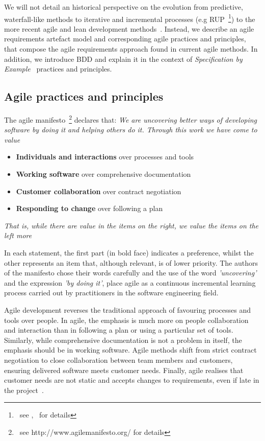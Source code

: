 \documentclass[dissertation,final]{softeng}
\begin{document}
We will not detail an historical perspective on the evolution from predictive, waterfall-like methods to iterative and incremental processes (e.g RUP~\footnote{~see ,~ \citet{Kruchten2003} for details}) to the more recent agile and lean development methods~\citep{Leffingwell2011,Larman2003}. Instead, we describe an agile requirements artefact model and corresponding agile practices and principles, that compose the agile requirements approach found in current agile methods. In addition, we introduce BDD and explain it in the context of \emph{Specification by Example}~\citep{Adzic201106} practices and principles.

\subsection{Agile practices and principles}
The agile manifesto~\footnote{~see http://www.agilemanifesto.org/ for details} declares that: 
\emph{We are uncovering better ways of developing software by doing it and helping others do it. Through this work we have come to value}

\begin{itemize}
\item \textbf{Individuals and interactions} over processes and tools
\item \textbf{Working software} over comprehensive documentation
\item \textbf{Customer collaboration} over contract negotiation
\item \textbf{Responding to change} over following a plan
\end{itemize}
\emph{That is, while there are value in the items on the right, we value the items on the left more}

In each statement, the first part (in bold face) indicates a preference, whilst the other represents an item that, although relevant, is of lower priority. The authors of the manifesto chose their words carefully and the use of the word \emph{'uncovering'} and the expression \emph{'by doing it'}, place agile as a continuous incremental learning process carried out by practitioners in the software engineering field.

Agile development reverses the traditional approach of favouring processes and tools over people. In agile, the emphasis is much more on people collaboration and interaction than in following a plan or using a particular set of tools. Similarly, while comprehensive documentation is not a problem in itself, the emphasis should be in working software. Agile methods shift from strict contract negotiation to close collaboration between team members and customers, ensuring delivered software meets customer needs. Finally, agile realises that customer needs are not static and accepts changes to requirements, even if late in the project~\citep{Highsmith:2000:ASD:323922}. 
\end{document}
